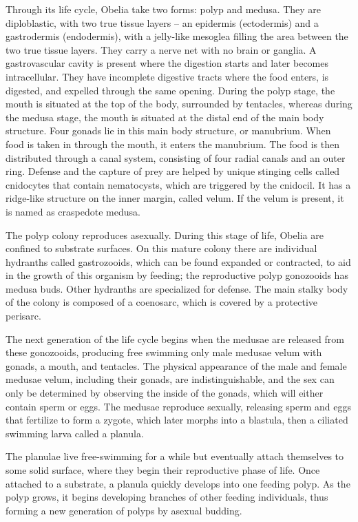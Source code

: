\documentclass[]{book}
\theoremstyle{definition}
\theoremstyle{definition}
\theoremstyle{definition}
\theoremstyle{remark}
\begin{document}
Through its life cycle, Obelia take two forms: polyp and medusa. They
are diploblastic, with two true tissue layers -- an epidermis
(ectodermis) and a gastrodermis (endodermis), with a jelly-like mesoglea
filling the area between the two true tissue layers. They carry a nerve
net with no brain or ganglia. A gastrovascular cavity is present where
the digestion starts and later becomes intracellular. They have
incomplete digestive tracts where the food enters, is digested, and
expelled through the same opening. During the polyp stage, the mouth is
situated at the top of the body, surrounded by tentacles, whereas during
the medusa stage, the mouth is situated at the distal end of the main
body structure. Four gonads lie in this main body structure, or
manubrium. When food is taken in through the mouth, it enters the
manubrium. The food is then distributed through a canal system,
consisting of four radial canals and an outer ring. Defense and the
capture of prey are helped by unique stinging cells called cnidocytes
that contain nematocysts, which are triggered by the cnidocil. It has a
ridge-like structure on the inner margin, called velum. If the velum is
present, it is named as craspedote medusa.

The polyp colony reproduces asexually. During this stage of life, Obelia
are confined to substrate surfaces. On this mature colony there are
individual hydranths called gastrozooids, which can be found expanded or
contracted, to aid in the growth of this organism by feeding; the
reproductive polyp gonozooids has medusa buds. Other hydranths are
specialized for defense. The main stalky body of the colony is composed
of a coenosarc, which is covered by a protective perisarc.

The next generation of the life cycle begins when the medusae are
released from these gonozooids, producing free swimming only male
medusae velum with gonads, a mouth, and tentacles. The physical
appearance of the male and female medusae velum, including their gonads,
are indistinguishable, and the sex can only be determined by observing
the inside of the gonads, which will either contain sperm or eggs. The
medusae reproduce sexually, releasing sperm and eggs that fertilize to
form a zygote, which later morphs into a blastula, then a ciliated
swimming larva called a planula.

The planulae live free-swimming for a while but eventually attach
themselves to some solid surface, where they begin their reproductive
phase of life. Once attached to a substrate, a planula quickly develops
into one feeding polyp. As the polyp grows, it begins developing
branches of other feeding individuals, thus forming a new generation of
polyps by asexual budding.
\end{document}
